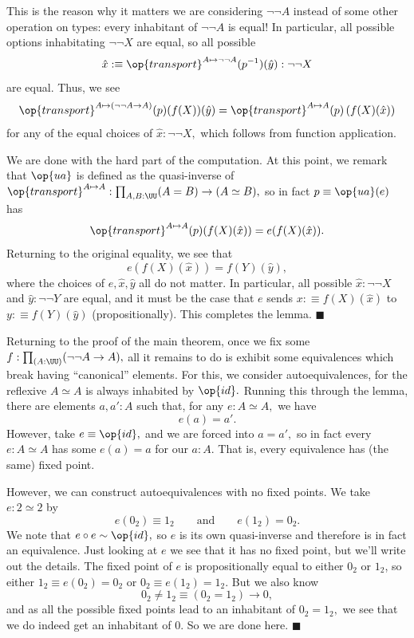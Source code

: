 This is the reason why it matters we are considering $\lnot\lnot A$ instead of some other operation on types: every inhabitant of $\lnot\lnot A$ is equal! In particular, all possible options inhabitating $\lnot\lnot X$ are equal, so all possible
\[\hat x:\equiv\op{transport}^{A\mapsto\lnot\lnot A}(p^{-1})(\hat y):\lnot\lnot X\]
are equal. Thus, we see
\[\op{transport}^{A\mapsto(\lnot\lnot A\to A)}(p)(f(X))(\hat y)=\op{transport}^{A\mapsto A}(p)\left(f(X)(\hat x)\right)\]
for any of the equal choices of $\hat x:\lnot\lnot X,$ which follows from function application.

We are done with the hard part of the computation. At this point, we remark that $\op{ua}$ is defined as the quasi-inverse of $\op{transport}^{A\mapsto A}:\prod_{A,B:\UU}(A=B)\to(A\simeq B),$ so in fact $p\equiv\op{ua}(e)$ has
\[\op{transport}^{A\mapsto A}(p)(f(X)(\hat x))=e(f(X)(\hat x)).\]
Returning to the original equality, we see that
\[e(f(X)(\hat x))=f(Y)(\hat y),\]
where the choices of $e,\hat x,\hat y$ all do not matter. In particular, all possible $\hat x:\lnot\lnot X$ and $\hat y:\lnot\lnot Y$ are equal, and it must be the case that $e$ sends $x:\equiv f(X)(\hat x)$ to $y:\equiv f(Y)(\hat y)$ (propositionally). This completes the lemma. $\blacksquare$

Returning to the proof of the main theorem, once we fix some $f:\prod_{(A:\UU)}(\lnot\lnot A\to A),$ all it remains to do is exhibit some equivalences which break having ``canonical'' elements. For this, we consider autoequivalences, for the reflexive $A\simeq A$ is always inhabited by $\op{id}.$ Running this through the lemma, there are elements $a,a':A$ such that, for any $e:A\simeq A,$ we have
\[e(a)=a'.\]
However, take $e\equiv\op{id},$ and we are forced into $a=a',$ so in fact every $e:A\simeq A$ has some $e(a)=a$ for our $a:A.$ That is, every equivalence has (the same) fixed point.

However, we can construct autoequivalences with no fixed points. We take $e:2\simeq2$ by
\[e(0_2)\equiv1_2\qquad\text{and}\qquad e(1_2)=0_2.\]
We note that $e\circ e\sim\op{id},$ so $e$ is its own quasi-inverse and therefore is in fact an equivalence. Just looking at $e$ we see that it has no fixed point, but we'll write out the details. The fixed point of $e$ is propositionally equal to either $0_2$ or $1_2$, so either $1_2\equiv e(0_2)=0_2$ or $0_2\equiv e(1_2)=1_2.$ But we also know
\[0_2\ne1_2\equiv(0_2=1_2)\to0,\]
and as all the possible fixed points lead to an inhabitant of $0_2=1_2,$ we see that we do indeed get an inhabitant of $0.$ So we are done here. $\blacksquare$

